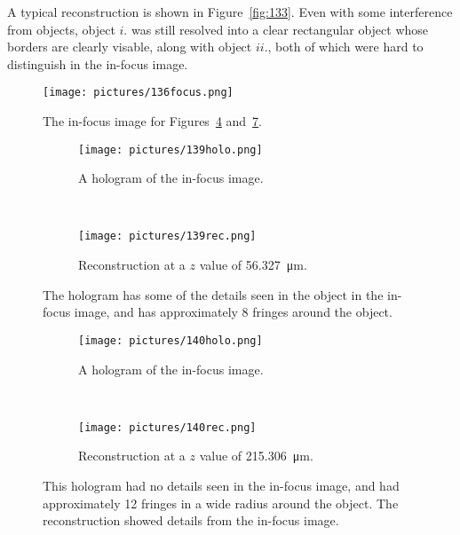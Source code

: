 A typical reconstruction is shown in Figure~\ref{fig:133}. Even with some
interference from objects, object $i.$ was still resolved into a clear
rectangular object whose borders are clearly visable, along with object
$ii.$, both of which were hard to distinguish in the in-focus image.


\begin{figure}
\begin{center}
    \texttt{[image: pictures/136focus.png]}
    \caption{The in-focus image for Figures~\ref{fig:139} and~\ref{fig:140}. }
    \label{fig:136focus}
\end{center}
\end{figure}


\begin{figure}[ht!]
    \begin{center}

        \begin{subfigure}[t]{0.4\textwidth}
            \label{fig:139holo}
            \texttt{[image: pictures/139holo.png]}
            \caption{A hologram of the in-focus image.}
        \end{subfigure}
        \\
        \begin{subfigure}[t]{\textwidth}
            \label{fig:139rec}
            \texttt{[image: pictures/139rec.png]}
            \caption{Reconstruction at a $z$ value of
                \SI{56.327}{\micro\meter}.}
        \end{subfigure}


    \end{center}
    \caption{%
        The hologram has some of the details seen in the object in the in-focus
        image, and has approximately 8 fringes around the object.
    }%
    \label{fig:139}
\end{figure}


\begin{figure}[ht!]
    \begin{center}

        \begin{subfigure}[t]{0.4\textwidth}
            \label{fig:140holo}
            \texttt{[image: pictures/140holo.png]}
            \caption{A hologram of the in-focus image.}
        \end{subfigure}
        \\
        \begin{subfigure}[t]{\textwidth}
            \label{fig:140rec}
            \texttt{[image: pictures/140rec.png]}
            \caption{Reconstruction at a $z$ value of
                \SI{215.306}{\micro\meter}.}
        \end{subfigure}


    \end{center}
    \caption{%
        This hologram had no details seen in the in-focus image, and had
        approximately 12 fringes in a wide radius around the object. The
        reconstruction showed details from the in-focus image.
    }%
    \label{fig:140}
\end{figure}

